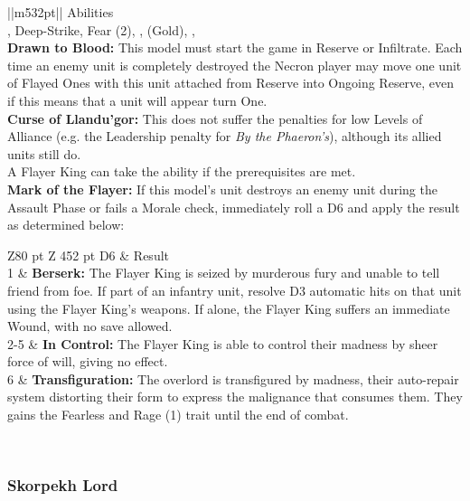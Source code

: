 \noindent
\begin{tabular}{||m{532pt}||}
	\hline
	Abilities \\
	\hline
	, Deep-Strike, Fear (2), , (Gold), ,  \\
	\textbf{Drawn to Blood:} This model must start the game in Reserve or Infiltrate. Each time an enemy unit is completely destroyed the Necron player may move one unit of Flayed Ones with this unit attached from Reserve into Ongoing Reserve, even if this means that a unit will appear turn One. \\
	\textbf{Curse of Llandu'gor:} This does not suffer the penalties for low Levels of Alliance (e.g. the Leadership penalty for \textit{By the Phaeron's}), although its allied units still do. \\
	A Flayer King can take the  ability if the prerequisites are met. \\
	\textbf{Mark of the Flayer:} If this model's unit destroys an enemy unit during the Assault Phase or fails a Morale check, immediately roll a D6 and apply the result as determined below: \\
	\begin{tabular}{Z{80 pt} Z {452 pt}}
		D6 & Result \\
		1 & \textbf{Berserk:} The Flayer King is seized by murderous fury and unable to tell friend from foe. If part of an infantry unit, resolve D3 automatic hits on that unit using the Flayer King's weapons. If alone, the Flayer King suffers an immediate Wound, with no save allowed. \\
		2-5 & \textbf{In Control:} The Flayer King is able to control their madness by sheer force of will, giving no effect. \\
		6 & \textbf{Transfiguration:} The overlord is transfigured by madness, their auto-repair system distorting their form to express the malignance that consumes them. They gains the Fearless and Rage (1) trait until the end of combat.\\
	\end{tabular} \\ %
	\hline
\end{tabular}

\newpage
\subsubsection{Skorpekh Lord}

